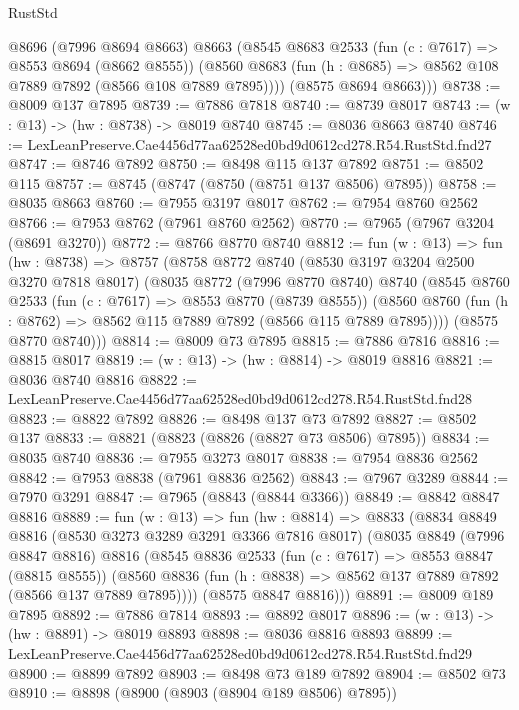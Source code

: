 \begin{lexlean}{RustStd}
\begin{coremodule}
        @8696
        (@7996 @8694 @8663)
        @8663
        (@8545
          @8683
          @2533
          (fun (c : @7617) => @8553 @8694 (@8662 @8555))
          (@8560 @8683 (fun (h : @8685) => @8562 @108 @7889 @7892 (@8566 @108 @7889 @7895))))
        (@8575 @8694 @8663)))
@8738 := @8009 @137 @7895
@8739 := @7886 @7818
@8740 := @8739 @8017
@8743 := (w : @13) -> (hw : @8738) -> @8019 @8740
@8745 := @8036 @8663 @8740
@8746 := LexLeanPreserve.Cae4456d77aa62528ed0bd9d0612cd278.R54.RustStd.fnd27
@8747 := @8746 @7892
@8750 := @8498 @115 @137 @7892
@8751 := @8502 @115
@8757 := @8745 (@8747 (@8750 (@8751 @137 @8506) @7895))
@8758 := @8035 @8663
@8760 := @7955 @3197 @8017
@8762 := @7954 @8760 @2562
@8766 := @7953 @8762 (@7961 @8760 @2562)
@8770 := @7965 (@7967 @3204 (@8691 @3270))
@8772 := @8766 @8770 @8740
@8812 := fun (w : @13) =>
  fun (hw : @8738) =>
  @8757
    (@8758
      @8772
      @8740
      (@8530 @3197 @3204 @2500 @3270 @7818 @8017)
      (@8035
        @8772
        (@7996 @8770 @8740)
        @8740
        (@8545
          @8760
          @2533
          (fun (c : @7617) => @8553 @8770 (@8739 @8555))
          (@8560 @8760 (fun (h : @8762) => @8562 @115 @7889 @7892 (@8566 @115 @7889 @7895))))
        (@8575 @8770 @8740)))
@8814 := @8009 @73 @7895
@8815 := @7886 @7816
@8816 := @8815 @8017
@8819 := (w : @13) -> (hw : @8814) -> @8019 @8816
@8821 := @8036 @8740 @8816
@8822 := LexLeanPreserve.Cae4456d77aa62528ed0bd9d0612cd278.R54.RustStd.fnd28
@8823 := @8822 @7892
@8826 := @8498 @137 @73 @7892
@8827 := @8502 @137
@8833 := @8821 (@8823 (@8826 (@8827 @73 @8506) @7895))
@8834 := @8035 @8740
@8836 := @7955 @3273 @8017
@8838 := @7954 @8836 @2562
@8842 := @7953 @8838 (@7961 @8836 @2562)
@8843 := @7967 @3289
@8844 := @7970 @3291
@8847 := @7965 (@8843 (@8844 @3366))
@8849 := @8842 @8847 @8816
@8889 := fun (w : @13) =>
  fun (hw : @8814) =>
  @8833
    (@8834
      @8849
      @8816
      (@8530 @3273 @3289 @3291 @3366 @7816 @8017)
      (@8035
        @8849
        (@7996 @8847 @8816)
        @8816
        (@8545
          @8836
          @2533
          (fun (c : @7617) => @8553 @8847 (@8815 @8555))
          (@8560 @8836 (fun (h : @8838) => @8562 @137 @7889 @7892 (@8566 @137 @7889 @7895))))
        (@8575 @8847 @8816)))
@8891 := @8009 @189 @7895
@8892 := @7886 @7814
@8893 := @8892 @8017
@8896 := (w : @13) -> (hw : @8891) -> @8019 @8893
@8898 := @8036 @8816 @8893
@8899 := LexLeanPreserve.Cae4456d77aa62528ed0bd9d0612cd278.R54.RustStd.fnd29
@8900 := @8899 @7892
@8903 := @8498 @73 @189 @7892
@8904 := @8502 @73
@8910 := @8898 (@8900 (@8903 (@8904 @189 @8506) @7895))

\end{coremodule}
\end{lexlean}
